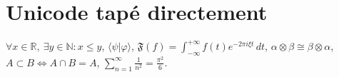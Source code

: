 \documentclass{article}
\begin{document}
\section{Unicode tapé directement}
$∀ x ∈ ℝ,\ ∃ y ∈ ℕ : x ≤ y$, $⟨ψ|φ⟩$, $𝔉(f) = ∫_{-∞}^{+∞} f(t) e^{-2πiξt} \, dt$,
$α ⊗ β ≅ β ⊗ α$, $A ⊂ B ⇔ A ∩ B = A$, $∑_{n=1}^{∞} \frac{1}{n^2} = \frac{π^2}{6}$.
\end{document}
